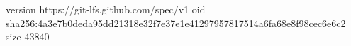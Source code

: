 version https://git-lfs.github.com/spec/v1
oid sha256:4a3e7b0deda95dd21318e32f7e37e1e41297957817514a6fa68e8f98cec6e6c2
size 43840
